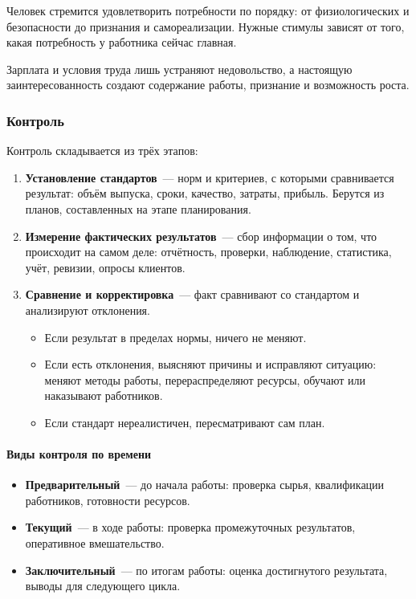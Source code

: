 \documentclass[12pt]{article}
\begin{document}
	\begin{person}
		Человек стремится удовлетворить потребности по порядку: от физиологических и безопасности до признания и самореализации. Нужные стимулы зависят от того, какая потребность у работника сейчас главная.
	\end{person}

	\begin{person}
		Зарплата и условия труда лишь устраняют недовольство, а настоящую заинтересованность создают содержание работы, признание и возможность роста.
	\end{person}

	\subsubsection{Контроль}

	Контроль складывается из трёх этапов:
	\begin{enumerate}
		\item \textbf{Установление стандартов}~--- норм и критериев, с которыми сравнивается результат: объём выпуска, сроки, качество, затраты, прибыль. Берутся из планов, составленных на этапе планирования.
		\item \textbf{Измерение фактических результатов}~--- сбор информации о том, что происходит на самом деле: отчётность, проверки, наблюдение, статистика, учёт, ревизии, опросы клиентов.
		\item \textbf{Сравнение и корректировка}~--- факт сравнивают со стандартом и анализируют отклонения.
		\begin{itemize}
			\item Если результат в пределах нормы, ничего не меняют.
			\item Если есть отклонения, выясняют причины и исправляют ситуацию: меняют методы работы, перераспределяют ресурсы, обучают или наказывают работников.
			\item Если стандарт нереалистичен, пересматривают сам план.
		\end{itemize}
	\end{enumerate}

	\paragraph{Виды контроля по времени}
	\begin{itemize}
		\item \textbf{Предварительный}~--- до начала работы: проверка сырья, квалификации работников, готовности ресурсов.
		\item \textbf{Текущий}~--- в ходе работы: проверка промежуточных результатов, оперативное вмешательство.
		\item \textbf{Заключительный}~--- по итогам работы: оценка достигнутого результата, выводы для следующего цикла.
	\end{itemize}
\end{document}

